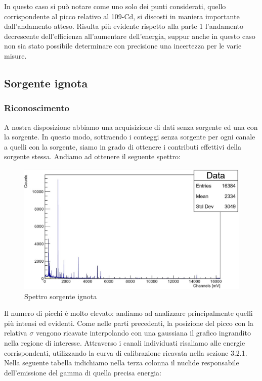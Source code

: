 \documentclass[a4paper,10pt]{article}
\begin{document}
In questo caso si pu\`o notare come uno solo dei punti considerati, quello corrispondente al picco relativo al 109-Cd, si discosti in maniera importante dall'andamento atteso. Risulta pi\`u evidente rispetto alla parte 1 l'andamento decrescente dell'efficienza all'aumentare dell'energia, suppur anche in questo caso non sia stato possibile determinare con precisione una incertezza per le varie misure.

\subsection{Sorgente ignota}


\subsubsection{Riconoscimento}
A nostra disposizione abbiamo una acquisizione di dati senza sorgente ed una con la sorgente. In questo modo, sottraendo i conteggi senza sorgente per ogni canale a quelli con la sorgente, siamo in grado di ottenere i contributi effettivi della sorgente stessa. Andiamo ad ottenere il seguente spettro:

\begin{figure}[H]
    \centering
    \includegraphics[scale=0.45]{grafici/sorgenteignota}
    \caption{Spettro sorgente ignota}
\end{figure}

Il numero di picchi \`e molto elevato: andiamo ad analizzare principalmente quelli pi\`u intensi ed evidenti. Come nelle parti precedenti, la posizione del picco con la relativa $\sigma$ vengono ricavate interpolando con una gaussiana il grafico ingrandito nella regione di interesse. Attraverso i canali individuati risaliamo alle energie corrispondenti, utilizzando la curva di calibrazione ricavata nella sezione 3.2.1. Nella seguente tabella indichiamo nella terza colonna il nuclide responsabile dell'emissione del gamma di quella precisa energia:
\end{document}
